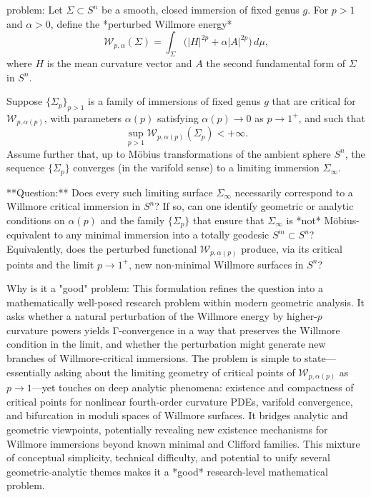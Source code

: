 problem:  
Let $\Sigma \subset S^n$ be a smooth, closed immersion of fixed genus $g$. For $p>1$ and $\alpha>0$, define the *perturbed Willmore energy*  
\[
\mathcal{W}_{p,\alpha}(\Sigma) = \int_{\Sigma} \big(|H|^{2p} + \alpha |A|^{2p}\big)\, d\mu,
\]  
where $H$ is the mean curvature vector and $A$ the second fundamental form of $\Sigma$ in $S^n$.  

Suppose $\{\Sigma_p\}_{p>1}$ is a family of immersions of fixed genus $g$ that are critical for $\mathcal{W}_{p,\alpha(p)}$, with parameters $\alpha(p)$ satisfying $\alpha(p)\to 0$ as $p\to1^+$, and such that  
\[
\sup_{p>1} \mathcal{W}_{p,\alpha(p)}(\Sigma_p) < +\infty.
\]
Assume further that, up to Möbius transformations of the ambient sphere $S^n$, the sequence $\{\Sigma_p\}$ converges (in the varifold sense) to a limiting immersion $\Sigma_\infty$.

**Question:**  
Does every such limiting surface $\Sigma_\infty$ necessarily correspond to a Willmore critical immersion in $S^n$?  
If so, can one identify geometric or analytic conditions on $\alpha(p)$ and the family $\{\Sigma_p\}$ that ensure that $\Sigma_\infty$ is *not* Möbius-equivalent to any minimal immersion into a totally geodesic $S^m \subset S^n$?  
Equivalently, does the perturbed functional $\mathcal{W}_{p,\alpha(p)}$ produce, via its critical points and the limit $p\to1^+$, new non-minimal Willmore surfaces in $S^n$?

Why is it a "good" problem:  
This formulation refines the question into a mathematically well-posed research problem within modern geometric analysis. It asks whether a natural perturbation of the Willmore energy by higher-$p$ curvature powers yields Γ-convergence in a way that preserves the Willmore condition in the limit, and whether the perturbation might generate new branches of Willmore-critical immersions. The problem is simple to state—essentially asking about the limiting geometry of critical points of $\mathcal{W}_{p,\alpha(p)}$ as $p\to1$—yet touches on deep analytic phenomena: existence and compactness of critical points for nonlinear fourth-order curvature PDEs, varifold convergence, and bifurcation in moduli spaces of Willmore surfaces. It bridges analytic and geometric viewpoints, potentially revealing new existence mechanisms for Willmore immersions beyond known minimal and Clifford families. This mixture of conceptual simplicity, technical difficulty, and potential to unify several geometric-analytic themes makes it a *good* research-level mathematical problem.
